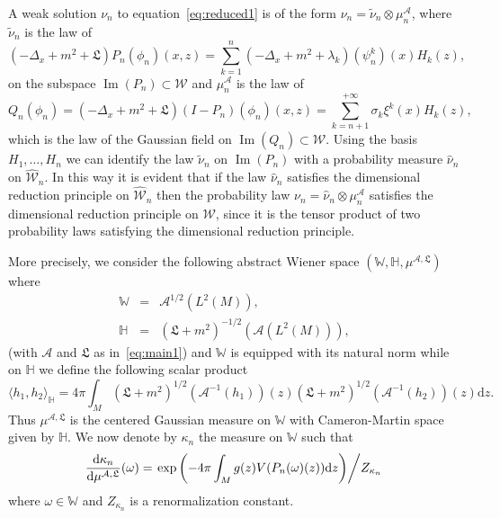 \documentclass[a4paper,10pt]{article}
\newcommand{\mathd}{\mathrm{d}}
\newcommand{\nobracket}{}
\newcommand{\tmop}[1]{\ensuremath{\operatorname{#1}}}
\begin{document}
A weak solution $\nu_n$ to equation~{\eqref{eq:reduced1}} is of the form
$\nu_n = \tilde{\nu}_n \otimes \mu_n^{\mathcal{A}}$, where $\tilde{\nu}_n$ is
the law of
\[ (- \Delta_x + m^2 + \mathfrak{L}) P_n (\phi_n) (x, z) = \sum_{k = 1}^n (-
   \Delta_x + m^2 + \lambda_k) (\psi^k_n) (x) H_k (z), \]
on the subspace $\tmop{Im} (P_n) \subset \mathcal{W}$ and
$\mu_n^{\mathcal{A}}$ is the law of
\[ Q_n (\phi_n) = (- \Delta_x + m^2 + \mathfrak{L}) (I - P_n) (\phi_n) (x, z)
   = \sum_{k = n + 1}^{+ \infty}  \sigma_k \xi^k (x) H_k (z), \]
which is the law of the Gaussian field on $\tmop{Im} (Q_n) \subset
\mathcal{W}$. Using the basis $H_1, \ldots, H_n$ we can identify the law
$\tilde{\nu}_n$ on $\tmop{Im} (P_n)$ with a probability measure $\hat{\nu}_n$
on $\widehat{\mathcal{W}}_n$. In this way it is evident that if the law
$\hat{\nu}_n$ satisfies the dimensional reduction principle on
$\widehat{\mathcal{W}}_n$ then the probability law $\nu_n = \hat{\nu}_n
\otimes \mu_n^{\mathcal{A}}$ satisfies the dimensional reduction principle on
$\mathcal{W}$, since it is the tensor product of two probability laws
satisfying the dimensional reduction principle.

More precisely, we consider the following abstract Wiener space $(\mathbb{W},
\mathbb{H}, \mu^{\mathcal{A}, \mathfrak{L}})$ where
\begin{eqnarray}
  \mathbb{W} & = & \mathcal{A}^{1 / 2} (L^2 (M)), \nonumber\\
  \mathbb{H} & = & (\mathcal{\mathfrak{L}} + m^2)^{- 1 / 2} (\mathcal{A} (L^2
  (M))), \nonumber
\end{eqnarray}
(with $\mathcal{A}$ and $\mathfrak{L}$ as in~{\eqref{eq:main1}}) and
$\mathbb{W}$ is equipped with its natural norm while on $\mathbb{H}$ we define
the following scalar product
\begin{equation}
  \langle h_1, h_2 \rangle_{\mathbb{H}} = 4 \pi \int_M (\mathfrak{L} + m^2)^{1
  / 2} (\mathcal{A}^{- 1} (h_1)) (z) (\mathfrak{L} + m^2)^{1 / 2}
  (\mathcal{A}^{- 1} (h_2)) (z) \mathd z. \label{eq:covariance1}
\end{equation}
Thus $\mu^{\mathcal{A}, \mathfrak{L}}$ is the centered Gaussian measure on
$\mathbb{W}$ with Cameron-Martin space given by $\mathbb{H}$. We now denote by
$\kappa_n$ the measure on $\mathbb{W}$ such that
\begin{equation}
  \frac{\mathd \kappa_n}{\mathd \mu^{\mathcal{A} \mathfrak{, L}}} (\omega) =
  \left. \exp \left( - 4 \pi \int_M g (z) V (P_n ( \nobracket
  \omega) \nobracket (z)) \mathd z \right) \middle/ Z_{\kappa_n} \right.
  \label{eq:kappa1}
\end{equation}
where $\omega \in \mathbb{W}$ and $Z_{\kappa_n}$ is a renormalization
constant.
\end{document}
